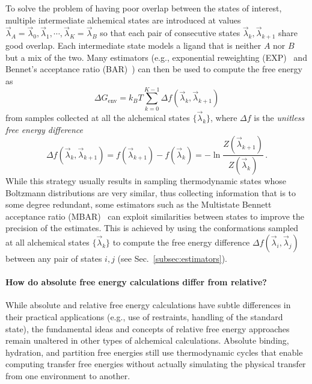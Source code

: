 \documentclass[9pt,bestpractices]{livecoms}
\begin{document}
To solve the problem of having poor overlap between the states of interest, multiple intermediate alchemical states are introduced at values $\vec{\lambda}_A = \vec{\lambda}_0, \vec{\lambda}_1, \cdots, \vec{\lambda}_K = \vec{\lambda}_B$ so that each pair of consecutive states $\vec{\lambda}_k, \vec{\lambda}_{k+1}$ share good overlap.
Each intermediate state models a ligand that is neither $A$ nor $B$ but a mix of the two.
Many estimators (e.g., exponential reweighting (EXP)~\cite{zwanzig1954hightemperature} and Bennet's acceptance ratio (BAR)~\cite{bennett1976efficient,shirts2003equilibriuma}) can then be used to compute the free energy as
\begin{equation}
    \Delta G_{\mathrm{env}} = k_BT \sum_{k=0}^{K-1} \Delta f(\vec{\lambda}_k, \vec{\lambda}_{k+1})
\end{equation}
from samples collected at all the alchemical states $\{\vec{\lambda}_k \}$, where $\Delta f$ is the \emph{unitless free energy difference}
\begin{equation}
    \Delta f(\vec{\lambda}_k, \vec{\lambda}_{k+1}) = f(\vec{\lambda}_{k+1}) - f(\vec{\lambda}_k) = - \ln \frac{Z(\vec{\lambda}_{k+1})}{Z(\vec{\lambda}_k)} \, .
\end{equation}
While this strategy usually results in sampling thermodynamic states whose Boltzmann distributions are very similar, thus collecting information that is to some degree redundant, some estimators such as the Multistate Bennett acceptance ratio (MBAR)~\cite{shirts2008statisticallya} can exploit similarities between states to improve the precision of the estimates. This is achieved by using the conformations sampled at all alchemical states $\{\vec{\lambda}_k \}$ to compute the free energy difference $\Delta f(\vec{\lambda}_i, \vec{\lambda}_{j})$ between any pair of states $i,j$ (see Sec.~\ref{subsec:estimators}).

\paragraph{How do absolute free energy calculations differ from relative?}

While absolute and relative free energy calculations have subtle differences in their practical applications (e.g., use of restraints, handling of the standard state), the fundamental ideas and concepts of relative free energy approaches remain unaltered in other types of alchemical calculations.
Absolute binding, hydration, and partition free energies still use thermodynamic cycles that enable computing transfer free energies without actually simulating the physical transfer from one environment to another.
\end{document}
